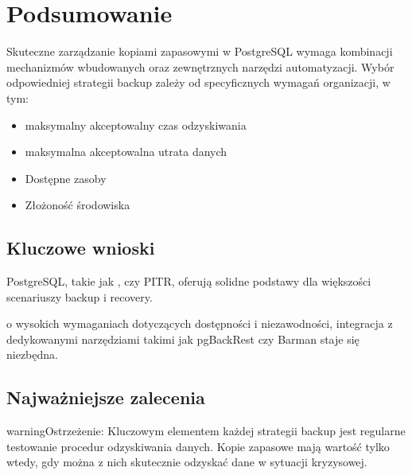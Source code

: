 \documentclass[a4paper,11pt,polish]{sphinxmanual}
\begin{document}
\section{Podsumowanie}
\label{\detokenize{Kopie_zapasowe_i_odzyskiwanie_danych/kopie_zapasowe_i_odzyskiwanie_danych:podsumowanie}}
\sphinxAtStartPar
Skuteczne zarządzanie kopiami zapasowymi w PostgreSQL wymaga kombinacji mechanizmów wbudowanych oraz zewnętrznych narzędzi automatyzacji. Wybór odpowiedniej strategii backup zależy od specyficznych wymagań organizacji, w tym:
\begin{itemize}
\item {} 
\sphinxAtStartPar
{} \sphinxhyphen{} maksymalny akceptowalny czas odzyskiwania

\item {} 
\sphinxAtStartPar
{} \sphinxhyphen{} maksymalna akceptowalna utrata danych

\item {} 
\sphinxAtStartPar
Dostępne zasoby

\item {} 
\sphinxAtStartPar
Złożoność środowiska

\end{itemize}


\subsection{Kluczowe wnioski}
\label{\detokenize{Kopie_zapasowe_i_odzyskiwanie_danych/kopie_zapasowe_i_odzyskiwanie_danych:kluczowe-wnioski}}
\sphinxAtStartPar
{} PostgreSQL, takie jak ,  czy PITR, oferują solidne podstawy dla większości scenariuszy backup i recovery.

\sphinxAtStartPar
{} o wysokich wymaganiach dotyczących dostępności i niezawodności, integracja z dedykowanymi narzędziami takimi jak pgBackRest czy Barman staje się niezbędna.


\subsection{Najważniejsze zalecenia}
\label{\detokenize{Kopie_zapasowe_i_odzyskiwanie_danych/kopie_zapasowe_i_odzyskiwanie_danych:najwazniejsze-zalecenia}}
\begin{sphinxadmonition}{warning}{Ostrzeżenie:}
\sphinxAtStartPar
Kluczowym elementem każdej strategii backup jest regularne testowanie procedur odzyskiwania danych. Kopie zapasowe mają wartość tylko wtedy, gdy można z nich skutecznie odzyskać dane w sytuacji kryzysowej.
\end{sphinxadmonition}
\end{document}
